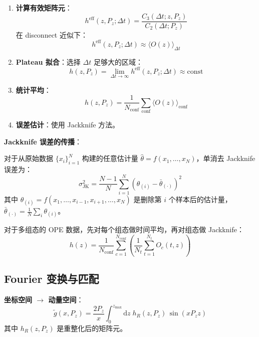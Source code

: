 \documentclass[11pt,a4paper]{ctexart}
\newcommand{\vev}[1]{\langle #1 \rangle}
\begin{document}
\begin{enumerate}
  \item \textbf{计算有效矩阵元}：
  \begin{equation}
  h^{\text{eff}}(z, P_z; \Delta t) = \frac{C_3(\Delta t; z, P_z)}{C_2(\Delta t; P_z)}
  \end{equation}
  在 disconnect 近似下：
  \begin{equation}
  h^{\text{eff}}(z, P_z; \Delta t) \approx \vev{O(z)}_{\Delta t}
  \end{equation}

  \item \textbf{Plateau 拟合}：选择 $\Delta t$ 足够大的区域：
  \begin{equation}
  h(z, P_z) = \lim_{\Delta t \to \infty} h^{\text{eff}}(z, P_z; \Delta t)
  \approx \text{const}
  \end{equation}

  \item \textbf{统计平均}：
  \begin{equation}
  h(z, P_z) = \frac{1}{N_{\text{conf}}} \sum_{\text{conf}} \vev{O(z)}_{\text{conf}}
  \end{equation}

  \item \textbf{误差估计}：使用 Jackknife 方法。
\end{enumerate}

\textbf{Jackknife 误差的传播}：

对于从原始数据 $\{x_i\}_{i=1}^{N}$ 构建的任意估计量 $\hat{\theta} = f(x_1,\ldots,x_N)$，单消去 Jackknife 误差为：
\begin{equation}
\sigma_{\text{JK}}^2 = \frac{N-1}{N} \sum_{i=1}^{N} (\theta_{(i)} - \bar{\theta}_{(\cdot)})^2
\end{equation}
其中 $\theta_{(i)} = f(x_1,\ldots,x_{i-1},x_{i+1},\ldots,x_N)$ 是删除第 $i$ 个样本后的估计量，$\bar{\theta}_{(\cdot)} = \frac{1}{N}\sum_i \theta_{(i)}$。

对于多组态的 OPE 数据，先对每个组态做时间平均，再对组态做 Jackknife：
\begin{equation}
h(z) = \frac{1}{N_{\text{conf}}} \sum_{c=1}^{N_{\text{conf}}} \left( \frac{1}{N_t} \sum_{t=1}^{N_t} O_c(t, z) \right)
\end{equation}

\subsection{Fourier 变换与匹配}

\textbf{坐标空间 $\to$ 动量空间}：
\begin{equation}\label{eq:fourier}
\boxed{\tilde{g}(x, P_z) = \frac{2P_z}{x}
\int_{0}^{z_{\text{max}}} \mathrm{d}z \;
h_R(z, P_z) \, \sin(x P_z z)}
\end{equation}
其中 $h_R(z, P_z)$ 是重整化后的矩阵元。
\end{document}
